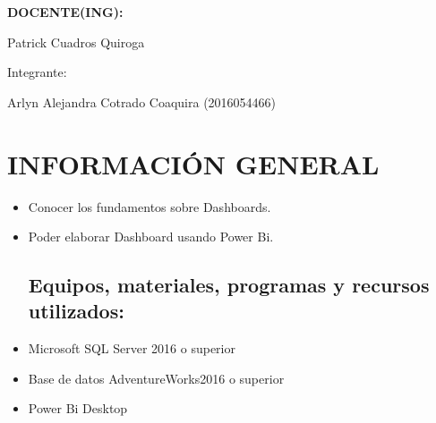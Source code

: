 \documentclass[12pt,letterpaper]{article}
\begin{document}
\begin{titlepage}
\begin{center}
\vspace*{0.3in}
\begin{Large}
\textbf{DOCENTE(ING):} \\
\end{Large}

\vspace*{0.1in}
\begin{large}
 Patrick Cuadros Quiroga\\
\end{large}

\vspace*{0.2in}
\vspace*{0.1in}
\begin{large}
Integrante: \\
\begin{flushleft}
Arlyn Alejandra Cotrado Coaquira	\hfill	(2016054466) 
\end{flushleft}
\end{large}
\end{center}

\end{titlepage}



\thispagestyle{empty} %
\newpage
\setcounter{page}{1} %

\section{INFORMACIÓN GENERAL}
	\begin{itemize}
\subsection{Objetivos:}
	\item Conocer los fundamentos sobre Dashboards.
	\item Poder elaborar Dashboard usando Power Bi.
\subsection{Equipos, materiales, programas y recursos utilizados:}
	\item Microsoft SQL Server 2016 o superior
	\item Base de datos AdventureWorks2016 o superior
	\item Power Bi Desktop
\end{itemize}
\end{document}
